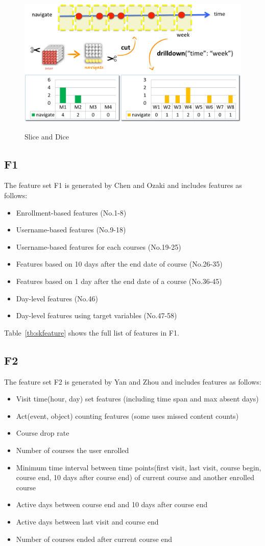 \begin{figure}[!t]
	\caption{Slice and Dice}
	\centering
	\includegraphics[width=0.5 \textwidth]{slice_and_dice}
	\label{fig:slice}
\end{figure}

\subsection{F1}

The feature set F1 is generated by Chen and Ozaki and includes features as follows:

\begin{itemize}
  \setlength\itemsep{0em}
  \item Enrollment-based features (No.1-8)
  \item Username-based features (No.9-18)
  \item Username-based features for each courses (No.19-25) 
  \item Features based on 10 days after the end date of course (No.26-35)
  \item Features based on 1 day after the end date of a course (No.36-45)
  \item Day-level features (No.46)
  \item Day-level features using target variables (No.47-58)
\end{itemize}

Table~\ref{tb:skfeature} shows the full list of features in F1.

\subsection{F2}
The feature set F2 is generated by Yan and Zhou and includes features as follows:
\begin{itemize}
  \setlength\itemsep{0em}
  \item Visit time(hour, day) set features (including time span and max absent days)
  \item Act(event, object) counting features (some uses missed content counts)
  \item Course drop rate
  \item Number of courses the user enrolled
  \item Minimum time interval between time points(first visit, last visit, course begin, course end, 10 days after course end) of current course and another enrolled course
  \item Active days between course end and 10 days after course end
  \item Active days between last visit and course end
  \item Number of courses ended after current course end
\end{itemize}

